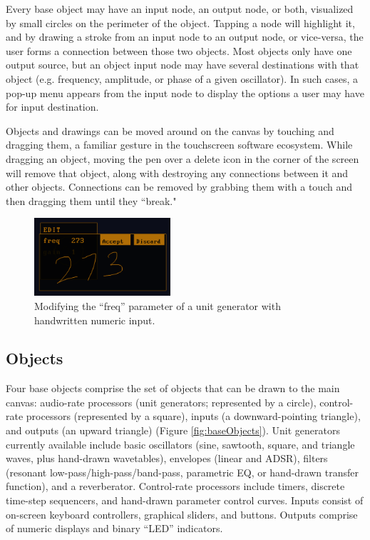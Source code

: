 \documentclass{nime-alternate}
\begin{document}
Every base object may have an input node, an output node, or both, visualized by small circles on the perimeter of the object. 
Tapping a node will highlight it, and by drawing a stroke from an input node to an output node, or vice-versa, the user forms a connection between those two objects. 
Most objects only have one output source, but an object input node may have several destinations with that object (e.g. frequency, amplitude, or phase of a given oscillator). 
In such cases, a pop-up menu appears from the input node to display the options a user may have for input destination. 

Objects and drawings can be moved around on the canvas by touching and dragging them, a familiar gesture in the touchscreen software ecosystem. 
While dragging an object, moving the pen over a delete icon in the corner of the screen will remove that object, along with destroying any connections between it and other objects. 
Connections can be removed by grabbing them with a touch and then dragging them until they ``break."

\begin{figure}[h]
	\centering
		\includegraphics[width=0.45\textwidth]{figures/editor.png}
	\caption{Modifying the ``freq'' parameter of a unit generator with handwritten numeric input.}
	\label{fig:editor}
\end{figure}

\subsection{Objects}
\label{sec:BaseGlyphs}

Four base objects comprise the set of objects that can be drawn to the main canvas: audio-rate processors (unit generators; represented by a circle), control-rate processors (represented by a square), inputs (a downward-pointing triangle), and outputs (an upward triangle) (Figure \ref{fig:baseObjects}). 
Unit generators currently available include basic oscillators (sine, sawtooth, square, and triangle waves, plus hand-drawn wavetables), envelopes (linear and ADSR), filters (resonant low-pass/high-pass/band-pass, parametric EQ, or hand-drawn transfer function), and a reverberator. 
Control-rate processors include timers, discrete time-step sequencers, and hand-drawn parameter control curves. 
Inputs consist of on-screen keyboard controllers, graphical sliders, and buttons. 
Outputs comprise of numeric displays and binary ``LED'' indicators.  
\end{document}

